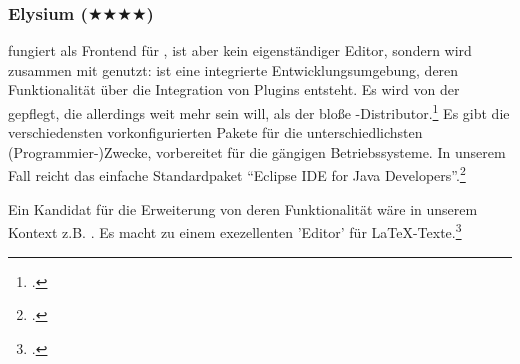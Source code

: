 %
%
%



\subsubsection{Elysium ($\bigstar\bigstar\bigstar\bigstar$)}

 fungiert als Frontend für , ist aber kein
eigenständiger Editor, sondern wird zusammen mit  genutzt:
 ist eine integrierte Entwicklungsumgebung, deren Funktionalität
über die Integration von Plugins entsteht. Es wird von der  gepflegt, die allerdings weit mehr sein will, als der bloße
-Distributor.\footcite[vgl.][\nopage wp]{Eclipse2018a} Es gibt die
verschiedensten vorkonfigurierten Pakete für die unterschiedlichsten
(Programmier-)Zwecke, vorbereitet für die gängigen Betriebssysteme. In unserem
Fall reicht das einfache Standardpaket \enquote{Eclipse IDE for Java
Developers}.\footcite[vgl.][\nopage wp]{Eclipse2018b}

Ein Kandidat für die Erweiterung von deren Funktionalität wäre  in unserem
Kontext z.B. . Es macht  zu einem exezellenten 'Editor'
für \LaTeX-Texte.\footcite[vgl.][\nopage wp]{TeXlipse2019a}

